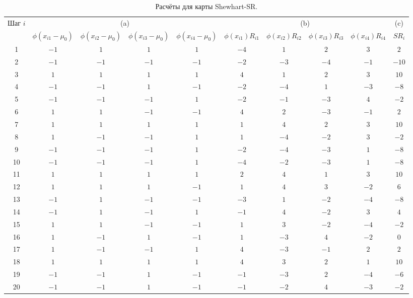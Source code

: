 \begin{table}[!ht]
	\centering
	\caption{Расчёты для карты Shewhart-SR.}
	\label{tab:4.7b}
	\footnotesize
	\setlength{\tabcolsep}{4pt}%
	\begin{tabular}{@{}cccccccccc@{}}\toprule
		Шаг \(i\) & \multicolumn{4}{c}{(a)} & \multicolumn{4}{c}{(b)} & (c) \\
		& \(\phi(x_{i1} - \mu_0)\) & \(\phi(x_{i2} - \mu_0)\) & \(\phi(x_{i3} - \mu_0)\) & \(\phi(x_{i4} - \mu_0)\) & \(\phi(x_{i1})R_{i1}\) & \(\phi(x_{i2})R_{i2}\) & \(\phi(x_{i3})R_{i3}\) & \(\phi(x_{i4})R_{i4}\) & \(SR_i\) \\ \midrule
		1 & \(-1\) & \(1\) & \(1\) & \(1\) & \(-4\) & \(1\) & \(2\) & \(3\) & \(2\) \\
		2 & \(-1\) & \(-1\) & \(-1\) & \(-1\) & \(-2\) & \(-3\) & \(-4\) & \(-1\) & \(-10\) \\
		3 & \(1\) & \(1\) & \(1\) & \(1\) & \(4\) & \(1\) & \(2\) & \(3\) & \(10\) \\
		4 & \(-1\) & \(-1\) & \(1\) & \(-1\) & \(-2\) & \(-4\) & \(1\) & \(-3\) & \(-8\) \\
		5 & \(-1\) & \(-1\) & \(-1\) & \(1\) & \(-2\) & \(-1\) & \(-3\) & \(4\) & \(-2\) \\
		6 & \(1\) & \(1\) & \(-1\) & \(-1\) & \(4\) & \(2\) & \(-3\) & \(-1\) & \(2\) \\
		7 & \(1\) & \(1\) & \(1\) & \(1\) & \(1\) & \(4\) & \(2\) & \(3\) & \(10\) \\
		8 & \(1\) & \(-1\) & \(-1\) & \(1\) & \(1\) & \(-4\) & \(-2\) & \(3\) & \(-2\) \\
		9 & \(-1\) & \(-1\) & \(-1\) & \(1\) & \(-2\) & \(-4\) & \(-3\) & \(1\) & \(-8\) \\
		10 & \(-1\) & \(-1\) & \(-1\) & \(1\) & \(-4\) & \(-2\) & \(-3\) & \(1\) & \(-8\) \\
		11 & \(1\) & \(1\) & \(1\) & \(1\) & \(2\) & \(4\) & \(1\) & \(3\) & \(10\) \\
		12 & \(1\) & \(1\) & \(1\) & \(-1\) & \(1\) & \(4\) & \(3\) & \(-2\) & \(6\) \\
		13 & \(-1\) & \(1\) & \(-1\) & \(-1\) & \(-3\) & \(1\) & \(-2\) & \(-4\) & \(-8\) \\
		14 & \(-1\) & \(1\) & \(-1\) & \(1\) & \(-1\) & \(4\) & \(-2\) & \(3\) & \(4\) \\
		15 & \(1\) & \(1\) & \(-1\) & \(-1\) & \(1\) & \(3\) & \(-2\) & \(-4\) & \(-2\) \\
		16 & \(1\) & \(-1\) & \(1\) & \(-1\) & \(1\) & \(-3\) & \(4\) & \(-2\) & \(0\) \\
		17 & \(1\) & \(-1\) & \(-1\) & \(1\) & \(4\) & \(-3\) & \(-1\) & \(2\) & \(2\) \\
		18 & \(1\) & \(1\) & \(1\) & \(1\) & \(4\) & \(3\) & \(2\) & \(1\) & \(10\) \\
		19 & \(-1\) & \(-1\) & \(1\) & \(-1\) & \(-1\) & \(-3\) & \(2\) & \(-4\) & \(-6\) \\
		20 & \(-1\) & \(-1\) & \(1\) & \(-1\) & \(-1\) & \(-2\) & \(4\) & \(-3\) & \(-2\) \\ \bottomrule
	\end{tabular}
\end{table}

